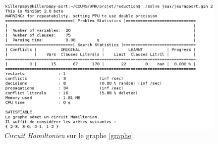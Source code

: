   \begin{figure}[!ht]
   \begin{center}
    \includegraphics[width=12cm]{images/chemin.eps}
    \caption{\emph{Circuit Hamiltonien} sur le graphe
    \ref{graphe}.\label{ham}}
   \end{center}
  \end{figure}